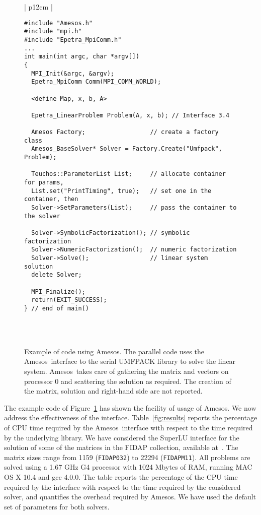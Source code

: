 \documentclass{llncs}
\newcommand{\amesos}{{\sc Amesos}}
\begin{document}
\begin{figure}
\begin{center}
\begin{tabular}{| p{12cm} | }
\hline
 \\ $\,$
\begin{minipage}{11.8cm}
\begin{verbatim}
#include "Amesos.h"
#include "mpi.h"
#include "Epetra_MpiComm.h"
...
int main(int argc, char *argv[])
{
  MPI_Init(&argc, &argv);
  Epetra_MpiComm Comm(MPI_COMM_WORLD);

  <define Map, x, b, A>

  Epetra_LinearProblem Problem(A, x, b); // Interface 3.4

  Amesos Factory;                  // create a factory class
  Amesos_BaseSolver* Solver = Factory.Create("Umfpack", Problem);

  Teuchos::ParameterList List;     // allocate container for params,
  List.set("PrintTiming", true);   // set one in the container, then
  Solver->SetParameters(List);     // pass the container to the solver

  Solver->SymbolicFactorization(); // symbolic factorization
  Solver->NumericFactorization();  // numeric factorization
  Solver->Solve();                 // linear system solution
  delete Solver;

  MPI_Finalize();
  return(EXIT_SUCCESS);
} // end of main()
\end{verbatim}
\end{minipage} \\
 \\
 \hline
\end{tabular}
\caption{Example of code using \amesos. The parallel code uses the \amesos\ interface to
  the serial UMFPACK library to solve the linear system. \amesos\ takes care
  of gathering the matrix and vectors on processor 0 and scattering the
  solution as required. The creation of the matrix, solution and
    right-hand side are not reported.}
\label{fig:example}
\end{center}
\end{figure}

The example code of Figure~\ref{fig:example} has shown the facility of usage
of \amesos. We now address the effectiveness of the interface.
Table~\ref{fig:results} reports the percentage of CPU time required by the
\amesos\ interface with respect to the time required by the underlying
library. We have considered the SuperLU interface for the solution
of some of the matrices in the FIDAP collection, available
at~\cite{boisvert97matrix}. The matrix sizes range from 1159
({\tt FIDAP032}) to 22294 ({\tt FIDAPM11}). All problems are solved using a
1.67 GHz G4 processor with 1024 Mbytes of RAM, running MAC OS X 10.4 and gcc
4.0.0. The table reports the percentage of the CPU time required by the
interface with respect to the time required by the considered solver, and
quantifies the overhead required by \amesos. We have used the default set of
parameters for both solvers.
\end{document}
